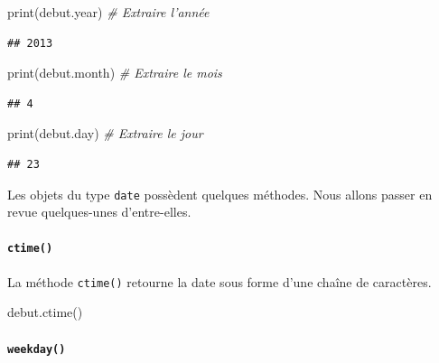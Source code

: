\documentclass[12pt,]{book}
\newenvironment{Shaded}{\begin{snugshade}}{\end{snugshade}}
\newcommand{\CommentTok}[1]{\textcolor[rgb]{0.56,0.35,0.01}{\textit{#1}}}
\newcommand{\BuiltInTok}[1]{#1}
\newcommand{\NormalTok}[1]{#1}
\let\oldparagraph\paragraph
\renewcommand{\paragraph}[1]{\oldparagraph{#1}\mbox{}}
\numberwithin{equation}{section}
\numberwithin{countremarque}{section}
\begin{document}
\begin{Shaded}
\begin{Highlighting}[]
\BuiltInTok{print}\NormalTok{(debut.year) }\CommentTok{# Extraire l'année}
\end{Highlighting}
\end{Shaded}

\begin{lstlisting}
## 2013
\end{lstlisting}

\begin{Shaded}
\begin{Highlighting}[]
\BuiltInTok{print}\NormalTok{(debut.month) }\CommentTok{# Extraire le mois}
\end{Highlighting}
\end{Shaded}

\begin{lstlisting}
## 4
\end{lstlisting}

\begin{Shaded}
\begin{Highlighting}[]
\BuiltInTok{print}\NormalTok{(debut.day) }\CommentTok{# Extraire le jour}
\end{Highlighting}
\end{Shaded}

\begin{lstlisting}
## 23
\end{lstlisting}

Les objets du type \texttt{date} possèdent quelques méthodes. Nous
allons passer en revue quelques-unes d'entre-elles.

\paragraph{\texorpdfstring{\texttt{ctime()}}{ctime()}}\label{ctime}

La méthode \texttt{ctime()} retourne la date sous forme d'une chaîne de
caractères.

\begin{Shaded}
\begin{Highlighting}[]
\NormalTok{debut.ctime()}
\end{Highlighting}
\end{Shaded}

\paragraph{\texorpdfstring{\texttt{weekday()}}{weekday()}}\label{weekday}
\end{document}
